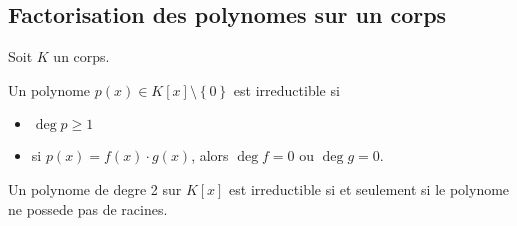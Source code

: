 \documentclass[../main.tex]{subfiles}
\begin{document}
\subsection{Factorisation des polynomes sur un corps}
Soit $K$ un corps.
\begin{defn}
	Un polynome $p( x)  \in K[x] \setminus \left\{ 0 \right\} $ est irreductible si
	\begin{itemize}
	\item $\deg p \geq 1$ 
	\item si $p( x) = f( x) \cdot g( x) $, alors $\deg f =0$ ou $\deg g=0$.
	\end{itemize}
	
\end{defn}
\begin{thm}
	Un polynome de degre 2 sur $K[x]$ est irreductible si et seulement si le polynome ne possede pas de racines.
\end{thm}
\end{document}
